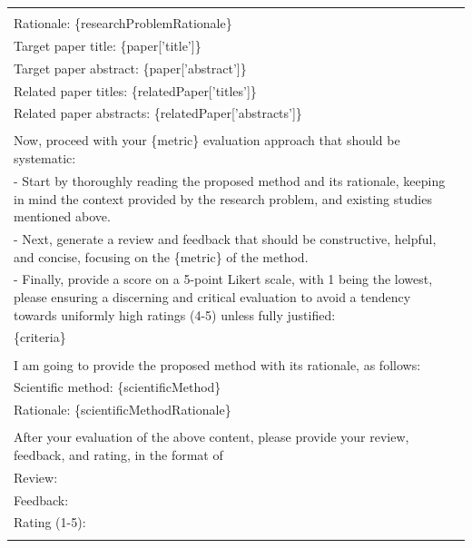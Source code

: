 \begin{table}
{\begin{tabular}{ll}
{            \multicolumn{1}{p{.92\textwidth}}{{Research problem: \{researchProblem\}}} \\
            \multicolumn{1}{p{.92\textwidth}}{{Rationale: \{researchProblemRationale\}}} \\ 
            \multicolumn{1}{p{.92\textwidth}}{{Target paper title: \{paper['title']\}}} \\
            \multicolumn{1}{p{.92\textwidth}}{{Target paper abstract: \{paper['abstract']\} }} \\
            \multicolumn{1}{p{.92\textwidth}}{{Related paper titles: \{relatedPaper['titles']\}}} \\
            \multicolumn{1}{p{.92\textwidth}}{{Related paper abstracts: \{relatedPaper['abstracts']\} }} \\ \\
            \multicolumn{1}{p{.92\textwidth}}{{Now, proceed with your \{metric\} evaluation approach that should be systematic:}} \\
            \multicolumn{1}{p{.92\textwidth}}{{- Start by thoroughly reading the proposed method and its rationale, keeping in mind the context provided by the research problem, and existing studies mentioned above.}} \\
            \multicolumn{1}{p{.92\textwidth}}{{- Next, generate a review and feedback that should be constructive, helpful, and concise, focusing on the \{metric\} of the method.}} \\
            \multicolumn{1}{p{.92\textwidth}}{{- Finally, provide a score on a 5-point Likert scale, with 1 being the lowest, please ensuring a discerning and critical evaluation to avoid a tendency towards uniformly high ratings (4-5) unless fully justified:}} \\ 
            \multicolumn{1}{p{.92\textwidth}}{{\{criteria\}}} \\ \\
            \multicolumn{1}{p{.92\textwidth}}{{I am going to provide the proposed method with its rationale, as follows:}} \\
            \multicolumn{1}{p{.92\textwidth}}{{Scientific method: \{scientificMethod\}}} \\
            \multicolumn{1}{p{.92\textwidth}}{{Rationale: \{scientificMethodRationale\}}} \\ \\
            \multicolumn{1}{p{.92\textwidth}}{{After your evaluation of the above content, please provide your review, feedback, and rating, in the format of}} \\ 
            \multicolumn{1}{p{.92\textwidth}}{{Review: }} \\
            \multicolumn{1}{p{.92\textwidth}}{{Feedback: }} \\
            \multicolumn{1}{p{.92\textwidth}}{{Rating (1-5): }} \\
        } \\
        \bottomrule
        \end{tabular}
    }
\end{table}


